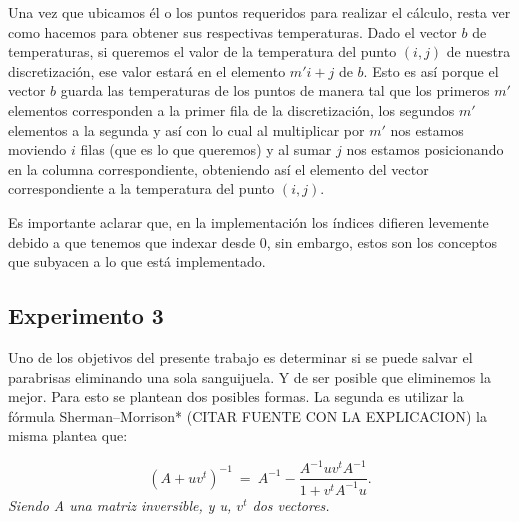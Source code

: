 Una vez que ubicamos él o los puntos requeridos para realizar el cálculo, resta ver como hacemos para obtener sus respectivas temperaturas. Dado el vector $b$ de temperaturas, si queremos el valor de la temperatura del punto $(i, j)$ de nuestra discretización, ese valor estará en el elemento $m'i + j$ de $b$. Esto es así porque el vector $b$ guarda las temperaturas de los puntos de manera tal que los primeros $m'$ elementos corresponden a la primer fila de la discretización, los segundos $m'$ elementos a la segunda y así con lo cual al multiplicar por $m'$ nos estamos moviendo $i$ filas (que es lo que queremos) y al sumar $j$ nos estamos posicionando en la columna correspondiente, obteniendo así el elemento del vector correspondiente a la temperatura del punto $(i, j)$.
\par Es importante aclarar que, en la implementación los índices difieren levemente debido a que tenemos que indexar desde 0, sin embargo, estos son los conceptos que subyacen a lo que está implementado.


\subsection{Experimento 3}

Uno de los objetivos del presente trabajo es determinar si se puede salvar el parabrisas eliminando una sola sanguijuela. Y de ser posible que eliminemos la mejor. Para esto se plantean dos posibles formas. La segunda es utilizar la fórmula Sherman–Morrison* (CITAR FUENTE CON LA EXPLICACION) la misma plantea que:

\begin{equation}
	(A+ uv^t)^{-1} \ =\ A^{-1} - \frac{ A^{-1} u v^t A^{-1} }{1+v^t A^{-1}u}.\label{eq:sm}
\end{equation} 
\textit{Siendo A una matriz inversible, y u, $v^t$ dos vectores.}


